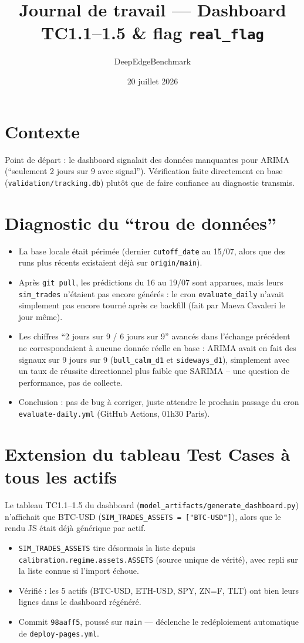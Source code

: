 \documentclass[11pt]{article}
\title{Journal de travail --- Dashboard TC1.1--1.5 \& flag \texttt{real\_flag}}
\author{DeepEdgeBenchmark}
\date{20 juillet 2026}
\begin{document}
\maketitle

\section{Contexte}
Point de départ : le dashboard signalait des données manquantes pour ARIMA
(``seulement 2 jours sur 9 avec signal''). Vérification faite directement en
base (\texttt{validation/tracking.db}) plutôt que de faire confiance au
diagnostic transmis.

\section{Diagnostic du ``trou de données''}
\begin{itemize}
  \item La base locale était périmée (dernier \texttt{cutoff\_date} au 15/07,
        alors que des runs plus récents existaient déjà sur \texttt{origin/main}).
  \item Après \texttt{git pull}, les prédictions du 16 au 19/07 sont apparues,
        mais leurs \texttt{sim\_trades} n'étaient pas encore générés : le cron
        \texttt{evaluate\_daily} n'avait simplement pas encore tourné après ce
        backfill (fait par Maeva Cavaleri le jour même).
  \item Les chiffres ``2 jours sur 9 / 6 jours sur 9'' avancés dans l'échange
        précédent ne correspondaient à aucune donnée réelle en base : ARIMA
        avait en fait des signaux sur 9 jours sur 9 (\texttt{bull\_calm\_d1} et
        \texttt{sideways\_d1}), simplement avec un taux de réussite directionnel
        plus faible que SARIMA -- une question de performance, pas de collecte.
  \item Conclusion : pas de bug à corriger, juste attendre le prochain passage
        du cron \texttt{evaluate-daily.yml} (GitHub Actions, 01h30 Paris).
\end{itemize}

\section{Extension du tableau Test Cases à tous les actifs}
Le tableau TC1.1--1.5 du dashboard (\texttt{model\_artifacts/generate\_dashboard.py})
n'affichait que BTC-USD (\texttt{SIM\_TRADES\_ASSETS = ["BTC-USD"]}), alors que
le rendu JS était déjà générique par actif.
\begin{itemize}
  \item \texttt{SIM\_TRADES\_ASSETS} tire désormais la liste depuis
        \texttt{calibration.regime.assets.ASSETS} (source unique de vérité),
        avec repli sur la liste connue si l'import échoue.
  \item Vérifié : les 5 actifs (BTC-USD, ETH-USD, SPY, ZN=F, TLT) ont bien
        leurs lignes dans le dashboard régénéré.
  \item Commit \texttt{98aaff5}, poussé sur \texttt{main} --- déclenche le
        redéploiement automatique de \texttt{deploy-pages.yml}.
\end{itemize}
\end{document}
